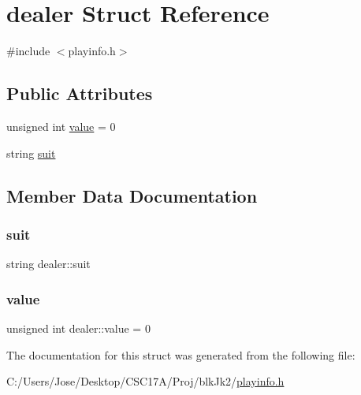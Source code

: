 \hypertarget{structdealer}{}\section{dealer Struct Reference}
\label{structdealer}


{\ttfamily \#include $<$playinfo.\+h$>$}

\subsection*{Public Attributes}
\begin{DoxyCompactItemize}
\item 
unsigned int \hyperlink{structdealer_a219ecd2fac1ba66a587925272daebb44}{value} = 0
\item 
string \hyperlink{structdealer_aad8ef1a02957ef6f542c1cea1f41fc2f}{suit}
\end{DoxyCompactItemize}


\subsection{Member Data Documentation}
\hypertarget{structdealer_aad8ef1a02957ef6f542c1cea1f41fc2f}{}\label{structdealer_aad8ef1a02957ef6f542c1cea1f41fc2f} 
\subsubsection{\texorpdfstring{suit}{suit}}
{\footnotesize\ttfamily string dealer\+::suit}

\hypertarget{structdealer_a219ecd2fac1ba66a587925272daebb44}{}\label{structdealer_a219ecd2fac1ba66a587925272daebb44} 
\subsubsection{\texorpdfstring{value}{value}}
{\footnotesize\ttfamily unsigned int dealer\+::value = 0}



The documentation for this struct was generated from the following file\+:\begin{DoxyCompactItemize}
\item 
C\+:/\+Users/\+Jose/\+Desktop/\+C\+S\+C17\+A/\+Proj/blk\+Jk2/\hyperlink{playinfo_8h}{playinfo.\+h}\end{DoxyCompactItemize}
